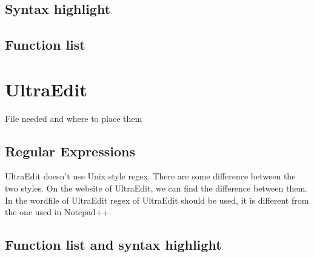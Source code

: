 \subsection{Syntax highlight}

\subsection{Function list}

\section{UltraEdit}
File needed and where to place them

\subsection{Regular Expressions}
UltraEdit doesn't use Unix style regex. There are some difference between the two styles. On the website of UltraEdit, we can find the difference between them. In the wordfile of UltraEdit regex of UltraEdit should be used, it is different from the one used in Notepad++.

\subsection{Function list and syntax highlight}
